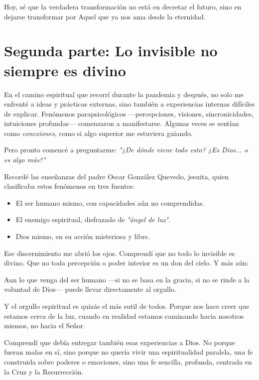 \documentclass[12pt,a4paper]{article}
\begin{document}
	Hoy, sé que la verdadera transformación no está en decretar el futuro, sino en dejarse transformar por Aquel que ya nos ama desde la eternidad.
	
	\section*{Segunda parte: Lo invisible no siempre es divino}
	
	En el camino espiritual que recorrí durante la pandemia y después, no solo me enfrenté a ideas y prácticas externas, sino también a experiencias internas difíciles de explicar. Fenómenos parapsicológicos —percepciones, visiones, sincronicidades, intuiciones profundas— comenzaron a manifestarse. Algunas veces se sentían como \emph{conexiones}, como si algo superior me estuviera guiando.
	
	Pero pronto comencé a preguntarme: \emph{"¿De dónde viene todo esto? ¿Es Dios... o es algo más?"}
	
	Recordé las enseñanzas del padre Oscar González Quevedo, jesuita, quien clasificaba estos fenómenos en tres fuentes:
	\begin{itemize}
		\item El ser humano mismo, con capacidades aún no comprendidas.
		\item El enemigo espiritual, disfrazado de \emph{"ángel de luz"}.
		\item Dios mismo, en su acción misteriosa y libre.
	\end{itemize}
	
	Ese discernimiento me abrió los ojos. Comprendí que no todo lo invisible es divino. Que no toda percepción o poder interior es un don del cielo. Y más aún:
	\begin{displayquote}
		Aun lo que venga del ser humano —si no se basa en la gracia, si no se rinde a la voluntad de Dios— puede llevar directamente al orgullo.
	\end{displayquote}
	
	Y el orgullo espiritual es quizás el más sutil de todos. Porque nos hace creer que estamos cerca de la luz, cuando en realidad estamos caminando hacia nosotros mismos, no hacia el Señor.
	
	Comprendí que debía entregar también esas experiencias a Dios. No porque fueran malas en sí, sino porque no quería vivir una espiritualidad paralela, una fe construida sobre poderes o emociones, sino una fe sencilla, profunda, centrada en la Cruz y la Resurrección.
	
\end{document}
